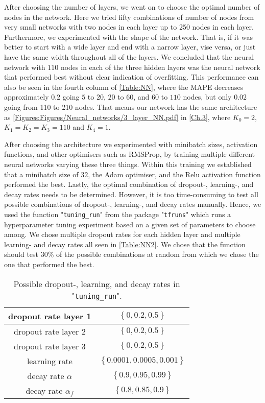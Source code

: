 After choosing the number of layers, we went on to choose the optimal number of nodes in the network. Here we tried fifty combinations of number of nodes from very small networks with two nodes in each layer up to 250 nodes in each layer. Furthermore, we experimented with the shape of the network. That is, if it was better to start with a wide layer and end with a narrow layer, vise versa, or just have the same width throughout all of the layers. We concluded that the neural network with $110$ nodes in each of the three hidden layers was the neural network that performed best without clear indication of overfitting. This performance can also be seen in the fourth column of \autoref{Table:NN}, where the MAPE decreases approximately $0.2$ going $5$ to $20$, $20$ to $60$, and $60$ to $110$ nodes, but only $0.02$ going from 110 to 210 nodes. That means our network has the same architecture as \autoref{Figures:Figures/Neural_networks/3_layer_NN.pdf} in \autoref{Ch.3}, where $K_0=2$, $K_1 = K_2 = K_3 = 110$ and $K_4 = 1$.

After choosing the architecture we experimented with minibatch sizes, activation functions, and other optimisers such as RMSProp, by training multiple different neural networks varying these three things. Within this training we established that a minibatch size of $32$, the Adam optimiser, and the Relu activation function performed the best. Lastly, the optimal combination of dropout-, learning-, and decay rates needs to be determined. However, it is too time-consuming to test all possible combinations of dropout-, learning-, and decay rates manually. Hence, we used the function "\lstinline{tuning_run}" from the package "\lstinline{tfruns}" which runs a hyperparameter tuning experiment based on a given set of parameters to choose among. We chose multiple dropout rates for each hidden layer and multiple learning- and decay rates all seen in \autoref{Table:NN2}. We chose that the function should test 30\% of the possible combinations at random from which we chose the one that performed the best.

\begin{table}[H]
    \centering
    {\renewcommand{\arraystretch}{1.25}\begin{tabular}{c|c}
        dropout rate layer 1  & $\left\{0, 0.2, 0.5 \right\}$\\ \hline
        dropout rate layer 2  &  $\left\{0, 0.2, 0.5\right\}$\\ \hline
        dropout rate layer 3  &  $\left\{0, 0.2, 0.5\right\}$\\ \hline
        learning rate         &  $\left\{0.0001, 0.0005, 0.001\right\}$\\ \hline
        decay rate $\alpha$   &  $\left\{0.9, 0.95, 0.99\right\}$\\ \hline
        decay rate $\alpha_f$ &  $\left\{0.8, 0.85, 0.9\right\}$\\ 
    \end{tabular}}
    \caption{Possible dropout-, learning, and decay rates in "\lstinline{tuning_run}".}
    \label{Table:NN2}
\end{table}

